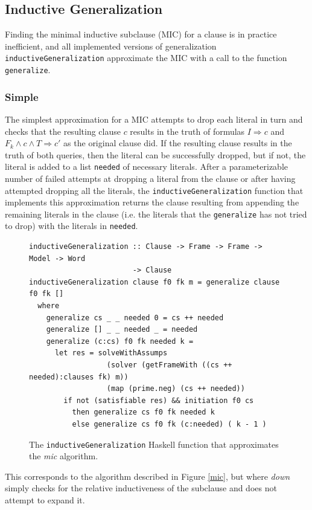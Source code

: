 \documentclass[12pt,a4paper,twoside,openright]{report}
\begin{document}
{\subsection{Inductive Generalization}
Finding the minimal inductive subclause (MIC) for a clause is in practice inefficient,
and all implemented versions of generalization
\verb,inductiveGeneralization, approximate the MIC with a call to the function
\verb,generalize,.

\subsubsection{Simple}
The simplest approximation for a MIC attempts to drop each literal in turn and checks
that the resulting clause $c$ results in the truth of formulas $I \Rightarrow c$ and
$F_k \wedge c \wedge T \Rightarrow c'$ as the original clause did. If the resulting clause
results in the truth of both queries, then the literal can be successfully dropped,
but if not, the literal is added to a list \verb,needed, of necessary literals.
After a parameterizable number of failed attempts at dropping a literal from the clause or after
having attempted dropping all the literals, the
\verb,inductiveGeneralization, function that implements this approximation
returns the clause resulting from appending the remaining
literals in the clause (i.e. the literals that the \verb,generalize, has not tried to drop)
with the literals in \verb,needed,.

\begin{figure}[!Ht]
\centering
\begin{lstlisting}
inductiveGeneralization :: Clause -> Frame -> Frame -> Model -> Word
                        -> Clause
inductiveGeneralization clause f0 fk m = generalize clause f0 fk []
  where
    generalize cs _ _ needed 0 = cs ++ needed
    generalize [] _ _ needed _ = needed
    generalize (c:cs) f0 fk needed k = 
      let res = solveWithAssumps
                  (solver (getFrameWith ((cs ++ needed):clauses fk) m))
                  (map (prime.neg) (cs ++ needed))
        if not (satisfiable res) && initiation f0 cs
          then generalize cs f0 fk needed k
          else generalize cs f0 fk (c:needed) ( k - 1 ) 
\end{lstlisting}
\caption{The {\tt inductiveGeneralization} Haskell function that approximates the {\it mic} algorithm.}
\end{figure}

This corresponds to the algorithm described in Figure \ref{mic}, but where {\it down} simply
checks for the relative inductiveness of the subclause and does not attempt to expand it.

}
\end{document}
